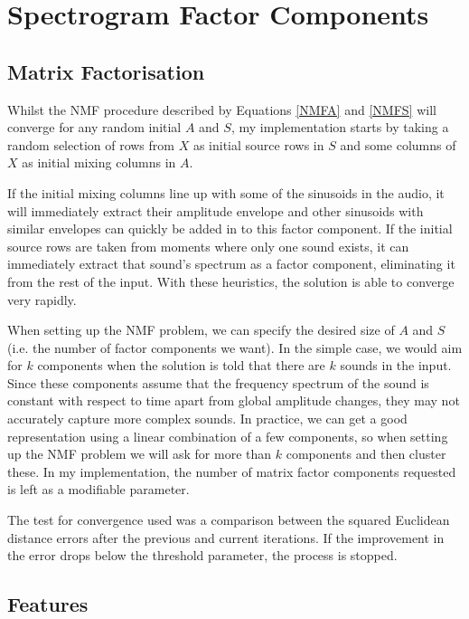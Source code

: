 \documentclass[12pt,a4paper,twoside,openright]{report}
\begin{document}
{\color{red}\section{Spectrogram Factor Components}

\subsection{Matrix Factorisation}

Whilst the NMF procedure described by Equations \ref{NMFA} and \ref{NMFS} will converge for any random initial $ A $ and $ S $, my implementation starts by taking a random selection of rows from $ X $ as initial source rows in $ S $ and some columns of $ X $ as initial mixing columns in $ A $.} If the initial mixing columns line up with some of the sinusoids in the audio, it will immediately extract their amplitude envelope and other sinusoids with similar envelopes can quickly be added in to this factor component. If the initial source rows are taken from moments where only one sound exists, it can immediately extract that sound's spectrum as a factor component, eliminating it from the rest of the input. With these heuristics, the solution is able to converge very rapidly.

When setting up the NMF problem, we can specify the desired size of $ A $ and $ S $ (i.e. the number of factor components we want). In the simple case, we would aim for $ k $ components when the solution is told that there are $ k $ sounds in the input. Since these components assume that the frequency spectrum of the sound is constant with respect to time apart from global amplitude changes, they may not accurately capture more complex sounds. In practice, we can get a good representation using a linear combination of a few components, so when setting up the NMF problem we will ask for more than $ k $ components and then cluster these. In my implementation, the number of matrix factor components requested is left as a modifiable parameter.

The test for convergence used was a comparison between the squared Euclidean distance errors after the previous and current iterations. If the improvement in the error drops below the threshold parameter, the process is stopped.

{\color{red}\subsection{Features}}
\end{document}
